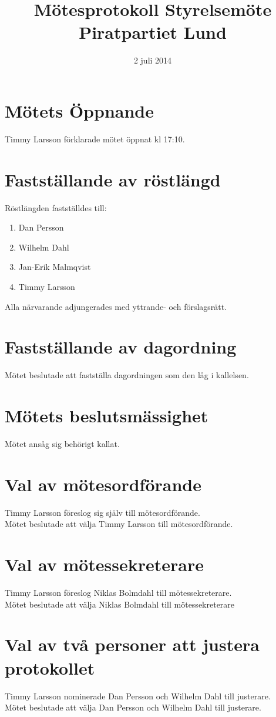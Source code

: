 \documentclass[a4paper,10pt]{article}
\title{\vspace{-1.5in}\textmd{\textbf{Mötesprotokoll Styrelsemöte Piratpartiet Lund}}}
\date{2 juli 2014}
\author{}
\begin{document}
\maketitle

\section{Mötets Öppnande}
Timmy Larsson förklarade mötet öppnat kl 17:10.

\section{Fastställande av röstlängd}
Röstlängden fastställdes till:
\begin{enumerate}
\item Dan Persson
\item Wilhelm Dahl
\item Jan-Erik Malmqvist
\item Timmy Larsson
\end{enumerate}
Alla närvarande adjungerades med yttrande- och förslagsrätt.

\section{Fastställande av dagordning}
Mötet beslutade att fastställa dagordningen som den låg i kallelsen.

\section{Mötets beslutsmässighet}
Mötet ansåg sig behörigt kallat.

\newpage

\section{Val av mötesordförande}
Timmy Larsson föreslog sig själv till mötesordförande.\\
Mötet beslutade att välja Timmy Larsson till mötesordförande.

\section{Val av mötessekreterare}
Timmy Larsson föreslog Niklas Bolmdahl till mötessekreterare.\\
Mötet beslutade att välja Niklas Bolmdahl till mötessekreterare

\section{Val av två personer att justera protokollet}
Timmy Larsson nominerade Dan Persson och Wilhelm Dahl till justerare.\\
Mötet beslutade att välja Dan Persson och Wilhelm Dahl till justerare.
\end{document}
